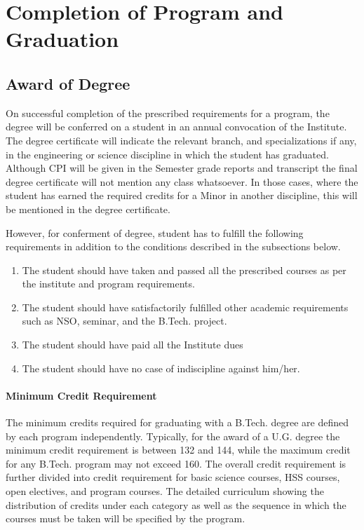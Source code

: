 \section{Completion of Program and Graduation}

\subsection{Award of Degree \label{lab:Award of Degree}}

On successful completion of the prescribed requirements for a program, the degree will be conferred on a student in an annual convocation of the Institute. The degree certificate will indicate the relevant branch, and specializations if any, in the engineering or science discipline in which the student has graduated. Although CPI will be given in the Semester grade reports and transcript the final degree certificate will not mention any class whatsoever. In those cases, where the student has earned the required credits for a Minor in another discipline, this will be mentioned in the degree certificate.

However, for conferment of degree, student has to fulfill the following requirements in addition to the conditions described in the subsections below. 

\begin{enumerate}[leftmargin=15mm]
    \item The student should have taken and passed all the prescribed courses as per the institute and program requirements. 
    \item The student should have satisfactorily fulfilled other academic requirements such as NSO, seminar, and the B.Tech. project. 
    \item The student should have paid all the Institute dues 
    \item The student should have no case of indiscipline against him/her.
\end{enumerate}

\paragraph{Minimum Credit Requirement} The minimum credits required for graduating with a B.Tech. degree are defined by each program independently. Typically, for the award of a U.G. degree the minimum credit requirement is between 132 and 144, while the maximum credit for any B.Tech. program may not exceed 160. The overall credit requirement is further divided into credit requirement for basic science courses, HSS courses, open electives, and program courses. The detailed curriculum showing the distribution of credits under each category as well as the sequence in which the courses must be taken will be specified by the program.

